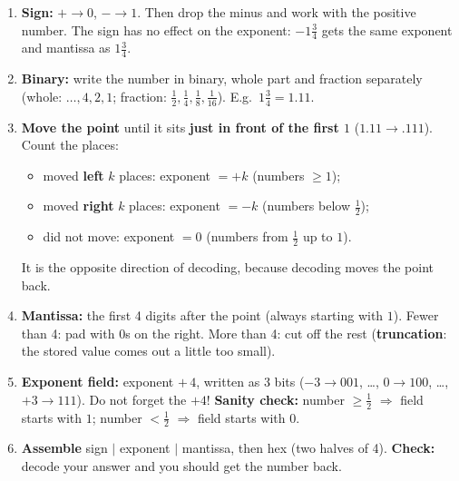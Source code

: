 \documentclass{fkt-notes}
\begin{document}
\begin{rulebox}[title={Method: encode a number into an 8-bit float (decoding run backwards)}]
  \begin{enumerate}[nosep]
    \item \textbf{Sign:} $+\to0$, $-\to1$. Then drop the minus and work with the positive number.
          The sign has no effect on the exponent: $-1\frac34$ gets the same exponent and mantissa as $1\frac34$.
    \item \textbf{Binary:} write the number in binary, whole part and fraction separately
          (whole: $\dots,4,2,1$; fraction: $\frac12,\frac14,\frac18,\frac1{16}$). E.g.\ $1\frac34=1.11$.
    \item \textbf{Move the point} until it sits \textbf{just in front of the first $1$}
          ($1.11\to.111$). Count the places:
          \begin{itemize}[nosep]
            \item moved \textbf{left} $k$ places: exponent $=+k$ (numbers $\geq1$);
            \item moved \textbf{right} $k$ places: exponent $=-k$ (numbers below $\frac12$);
            \item did not move: exponent $=0$ (numbers from $\frac12$ up to $1$).
          \end{itemize}
          It is the opposite direction of decoding, because decoding moves the point back.
    \item \textbf{Mantissa:} the first 4 digits after the point (always starting with $1$).
          Fewer than 4: pad with $0$s on the right. More than 4: cut off the rest
          (\textbf{truncation}: the stored value comes out a little too small).
    \item \textbf{Exponent field:} exponent $+\,4$, written as 3 bits
          ($-3\to001$, \dots, $0\to100$, \dots, $+3\to111$). Do not forget the $+4$!
          \textbf{Sanity check:} number $\geq\frac12$ $\Rightarrow$ field starts with $1$;
          number $<\frac12$ $\Rightarrow$ field starts with $0$.
    \item \textbf{Assemble} sign $|$ exponent $|$ mantissa, then hex (two halves of 4).
          \textbf{Check:} decode your answer and you should get the number back.
  \end{enumerate}
\end{rulebox}
\end{document}
